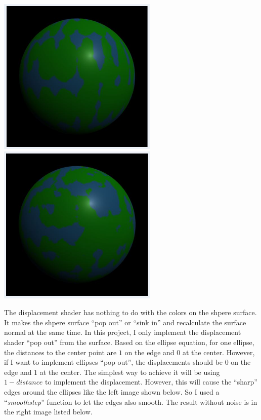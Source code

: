 \documentclass[letterpaper,14pt,titlepage,fleqn]{article}
\begin{document}
\begin{center}
	\includegraphics[width=3in]{surface_mag_01.jpg}
	\includegraphics*[width=3in]{surface_mag_03.jpg}
\end{center}
The displacement shader has nothing to do with the colors on the shpere surface. It makes the shpere surface ``pop out'' or ``sink in'' and recalculate the surface normal at the same time. In this project, I only implement the displacement shader ``pop out'' from the surface. Based on the ellipse equation, for one ellipse, the distances to the center point are $1$ on the edge and $0$ at the center. However, if I want to implement ellipses ``pop out'', the displacements should be $0$ on the edge and $1$ at the center. The simplest way to achieve it will be using $1 - distance$ to implement the displacement. However, this will cause the ``sharp'' edges around the ellipses like the left image shown below. So I used a ``\textit{smoothstep}'' function to let the edges also smooth. The result without noise is in the right image listed below.
\end{document}
